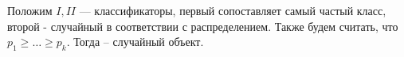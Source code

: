 \documentclass[a4paper]{article}
\begin{document}
Положим $I, II$ --- классификаторы, первый сопоставляет самый частый
класс, второй - случайный в соответствии с распределением. Также
будем считать, что $p_1 \ge \ldots \ge p_k$. Тогда
-- случайный объект.
\end{document}
